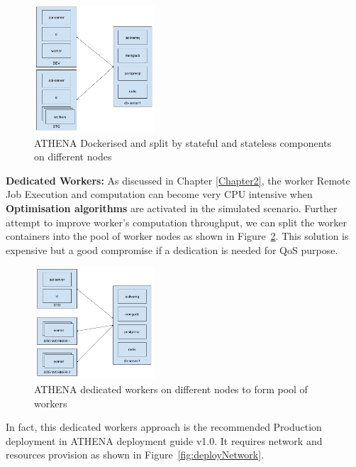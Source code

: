 \begin{figure}[H]
\centering
\includegraphics[width=0.4\textwidth]{Figures/ATHENA_dockerize}
\decoRule
\caption[ATHENA Dockerised]{ATHENA Dockerised and split by stateful and stateless components on different nodes}
\label{fig:deployDockerised}
\end{figure}

\textbf{Dedicated Workers:} \quad As discussed in Chapter \ref{Chapter2}, the worker Remote Job Execution and computation can become very CPU intensive when \textbf{Optimisation algorithms} are activated in the simulated scenario. Further attempt to improve worker's computation throughput, we can split the worker containers into the pool of worker nodes as shown in Figure~\ref{fig:dedicatedWorkers}. This solution is expensive but a good compromise if a dedication is needed for QoS purpose.

\begin{figure}[H]
\centering
\includegraphics[width=0.4\textwidth]{Figures/ATHENA_dedicated_workers}
\decoRule
\caption[ATHENA Dedicated Workers]{ATHENA dedicated workers on different nodes to form pool of workers}
\label{fig:dedicatedWorkers}
\end{figure}

In fact, this dedicated workers approach is the recommended Production deployment in ATHENA deployment guide v1.0\parencite{athenaDeployDoc}. It requires network and resources provision as shown in Figure~\ref{fig:deployNetwork}. 

